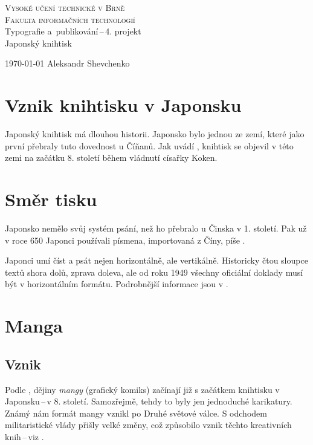 \documentclass[12pt, a4paper]{article}
\begin{document}
\begin{titlepage}
\begin{center}
    \huge
    \textsc{\Huge Vysoké učení technické v Brně\\
    \LARGE Fakulta informačních technologií}\\
    \LARGE Typografie a~publikování\,--\,4. projekt\\
    \Huge Japonský knihtisk\\
\end{center}
{\Large \today \hfill
Aleksandr Shevchenko}
\end{titlepage}

\section{Vznik knihtisku v Japonsku}

Japonský knihtisk má dlouhou historii. Japonsko bylo jednou ze zemí, které jako první přebraly tuto dovednost u Číňanů. Jak uvádí \cite{Egorova2015}, knihtisk se objevil v této zemi na začátku 8. století během vládnutí císařky Koken.

\section{Směr tisku}
Japonsko nemělo svůj systém psání, než ho přebralo u Činska v 1. století. Pak už v roce 650 Japonci používali písmena, importovaná z Číny, píše \cite{Skritter2014}. 

Japonci umí číst a psát nejen horizontálně, ale vertikálně. Historicky čtou sloupce textů shora dolů, zprava doleva, ale od roku 1949 všechny oficiální doklady musí být v horizontálním formátu. Podrobnější informace jsou v \cite{Osaka1991}.

\section{Manga}
\subsection{Vznik}
Podle \cite{Mccarthy2014}, dějiny \emph{mangy} (grafický komiks) začínají již s začátkem knihtisku v Japonsku\,--\,v 8. století. Samozřejmě, tehdy to byly jen jednoduché karikatury. Známý nám formát mangy vznikl po Druhé světové válce. S odchodem militaristické vlády přišly velké změny, což způsobilo vznik těchto kreativních knih\,--\,viz \cite{Jays2016}.
\end{document}
